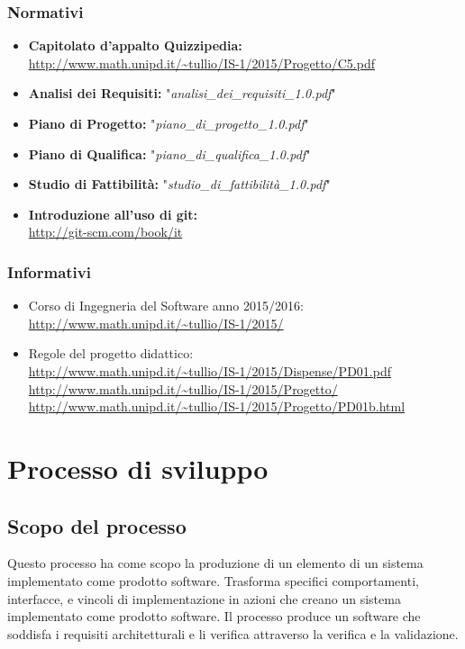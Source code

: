 \documentclass[a4paper,11pt]{article}
\begin{document}
			\subsubsection{Normativi}
				\begin{itemize}
					\item \textbf{Capitolato d'appalto Quizzipedia:}\\
					\url{http://www.math.unipd.it/~tullio/IS-1/2015/Progetto/C5.pdf}
					\item \textbf{Analisi dei Requisiti:} "\textit{analisi\_dei\_requisiti\_1.0.pdf}"
					\item \textbf{Piano di Progetto:} "\textit{piano\_di\_progetto\_1.0.pdf}"
					\item \textbf{Piano di Qualifica:} "\textit{piano\_di\_qualifica\_1.0.pdf}"
					\item \textbf{Studio di Fattibilità:} "\textit{studio\_di\_fattibilità\_1.0.pdf}"
					\item \textbf{Introduzione all'uso di git:} \\
					\url{http://git-scm.com/book/it} 
				\end{itemize}
			\subsubsection{Informativi}
				\begin{itemize}
					\item Corso di Ingegneria del Software anno 2015/2016:\\
					\url{http://www.math.unipd.it/~tullio/IS-1/2015/}
					\item Regole del progetto didattico:\\
					\url{http://www.math.unipd.it/~tullio/IS-1/2015/Dispense/PD01.pdf}
					\url{http://www.math.unipd.it/~tullio/IS-1/2015/Progetto/}\\
					\url{http://www.math.unipd.it/~tullio/IS-1/2015/Progetto/PD01b.html}
				\end{itemize}
	
	\newpage
	\section{Processo di sviluppo}
		\subsection{Scopo del processo}
	
		Questo processo ha come scopo la produzione di un elemento di un sistema implementato come prodotto software. Trasforma specifici comportamenti, interfacce, e vincoli di implementazione in azioni che creano un sistema implementato come prodotto software. Il processo produce un software che soddisfa i requisiti architetturali e li verifica attraverso la
	verifica e la validazione.	
\end{document}
